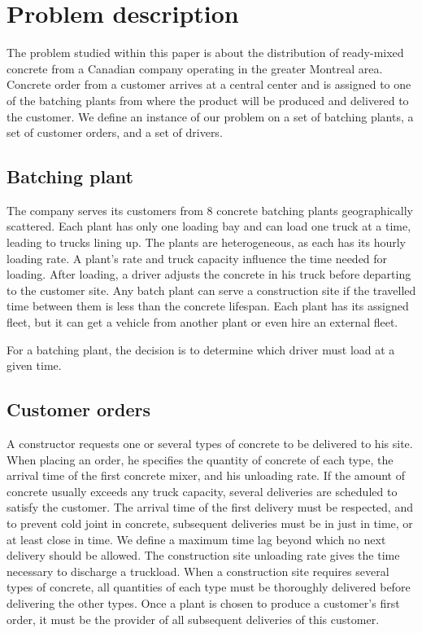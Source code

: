\documentclass{article}
\begin{document}
{%

 

 

\section{Problem description}
\label{desc_form}
The problem studied within this paper is about the distribution of ready-mixed concrete from a Canadian company operating in the greater Montreal area. Concrete order from a customer arrives at a central center and is assigned to one of the batching plants from where the product will be produced and delivered to the customer. We define an instance of our problem on a set of batching plants, a set of customer orders, and a set of drivers. 

\subsection*{Batching plant} 

 

The company serves its customers from 8 concrete batching plants geographically scattered. Each plant has only one loading bay and can load one truck at a time, leading to trucks lining up. The plants are heterogeneous, as each has its hourly loading rate. A plant's rate and truck capacity influence the time needed for loading. After loading, a driver adjusts the concrete in his truck before departing to the customer site. Any batch plant can serve a construction site if the travelled time between them is less than the concrete lifespan. Each plant has its assigned fleet, but it can get a vehicle from another plant or even hire an external fleet. 

 For a batching plant, the decision is to determine which driver must load at a given time. 

\subsection*{Customer orders} 

A constructor requests one or several types of concrete to be delivered to his site. When placing an order, he specifies the quantity of concrete of each type, the arrival time of the first concrete mixer, and his unloading rate. If the amount of concrete usually exceeds any truck capacity, several deliveries are scheduled to satisfy the customer. The arrival time of the first delivery must be respected, and to prevent cold joint in concrete, subsequent deliveries must be in just in time, or at least close in time. We define a maximum time lag beyond which no next delivery should be allowed. The construction site unloading rate gives the time necessary to discharge a truckload. When a construction site requires several types of concrete, all quantities of each type must be thoroughly delivered before delivering the other types. Once a plant is chosen to produce a customer's first order, it must be the provider of all subsequent deliveries of this customer. 

}
\end{document}
